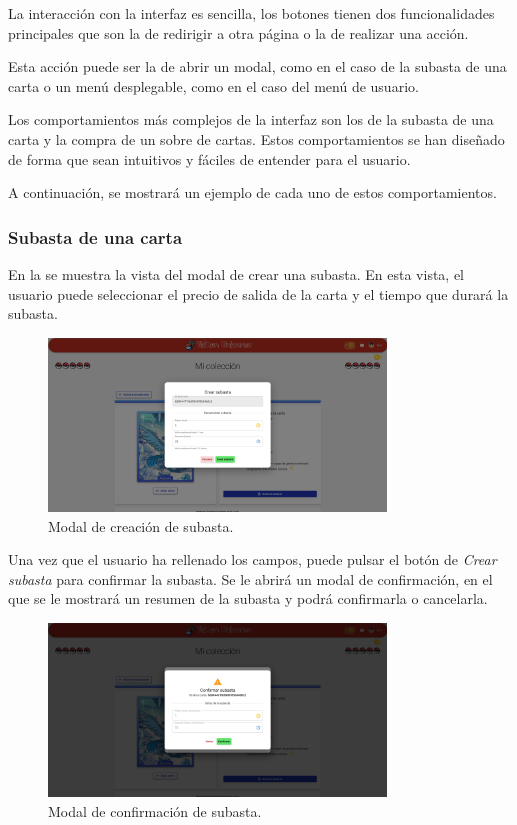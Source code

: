 La interacción con la interfaz es sencilla,
los botones tienen dos funcionalidades principales que son la de redirigir a otra página o la de realizar una acción.

Esta acción puede ser la de abrir un modal, como en el caso de la subasta de una carta o un menú desplegable, como en el caso del menú de usuario.

Los comportamientos más complejos de la interfaz son los de la subasta de una carta y la compra de un sobre de cartas.
Estos comportamientos se han diseñado de forma que sean intuitivos y fáciles de entender para el usuario.

A continuación, se mostrará un ejemplo de cada uno de estos comportamientos.

\subsubsection{Subasta de una carta}
En la  se muestra la vista del modal de crear una subasta.
En esta vista, el usuario puede seleccionar el precio de salida de la carta y el tiempo que durará la subasta.

\begin{figure}[H]
    \centering
    \includegraphics[width=0.8\textwidth]{figures/6-Analisis/6-Interfaz/interfaz/crear-subasta1.png}
    \caption{Modal de creación de subasta.}
    \hypertarget{fig:interfaz-subasta}{}
    \label{fig:interfaz-subasta}
\end{figure}

Una vez que el usuario ha rellenado los campos, puede pulsar el botón de \textit{Crear subasta} para confirmar la subasta.
Se le abrirá un modal de confirmación, en el que se le mostrará un resumen de la subasta y podrá confirmarla o cancelarla.

\begin{figure}[H]
    \centering
    \includegraphics[width=0.8\textwidth]{figures/6-Analisis/6-Interfaz/interfaz/crear-subasta2.png}
    \caption{Modal de confirmación de subasta.}
    \label{fig:interfaz-subasta-alerta}
\end{figure}

